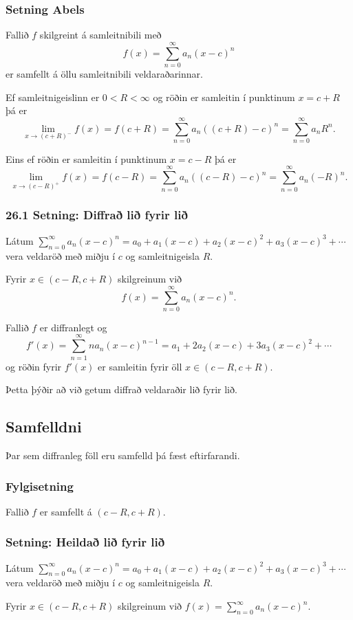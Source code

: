 \documentclass[icelandic,a4paper,12pt]{article}
\begin{document}
\subsubsection{Setning Abels}
Fallið $f$ skilgreint á samleitnibili með 
$$
f(x)=\sum_{n=0}^\infty a_n(x-c)^n
$$  
er samfellt á öllu samleitnibili veldaraðarinnar.  

Ef samleitnigeislinn er $0<R<\infty$ og röðin er samleitin í punktinum $x=c+R$ 
þá er 
$$\lim_{x\rightarrow (c+R)^-}f(x)=f(c+R)=\sum_{n=0}^\infty
a_n((c+R)-c)^n=\sum_{n=0}^\infty a_nR^n.$$

Eins ef röðin er samleitin í punktinum $x=c-R$ þá er
$$\lim_{x\rightarrow (c-R)^+}f(x)=f(c-R)=\sum_{n=0}^\infty
a_n((c-R)-c)^n=\sum_{n=0}^\infty a_n(-R)^n.$$

\subsubsection{26.1 Setning: Diffrað lið fyrir lið}
Látum $\sum_{n=0}^\infty a_n(x-c)^n=a_0+a_1(x-c)+a_2(x-c)^2+a_3(x-c)^3+\cdots$
vera veldaröð með miðju í $c$ og samleitnigeisla $R$. 

Fyrir $x\in(c-R, c+R)$ skilgreinum við 
$$
f(x)=\sum_{n=0}^\infty a_n(x-c)^n.
$$

Fallið $f$ er diffranlegt og 
$$f'(x)=\sum_{n=1}^\infty na_n(x-c)^{n-1}=a_1+2a_2(x-c)+3a_3(x-c)^2+\cdots$$
og röðin fyrir $f'(x)$ er samleitin fyrir öll $x\in(c-R, c+R)$.

Þetta þýðir að við getum diffrað veldaraðir lið fyrir lið.

\subsection{Samfelldni}
Þar sem diffranleg föll eru samfelld þá fæst eftirfarandi.

\subsubsection{Fylgisetning}
Fallið $f$ er samfellt á $(c-R, c+R)$.

\subsubsection{Setning: Heildað lið fyrir lið}
Látum $\sum_{n=0}^\infty a_n(x-c)^n=a_0+a_1(x-c)+a_2(x-c)^2+a_3(x-c)^3+\cdots$
vera veldaröð með miðju í $c$ og samleitnigeisla $R$. 

Fyrir $x\in(c-R, c+R)$ skilgreinum við $f(x)=\sum_{n=0}^\infty a_n(x-c)^n$.
\end{document}
